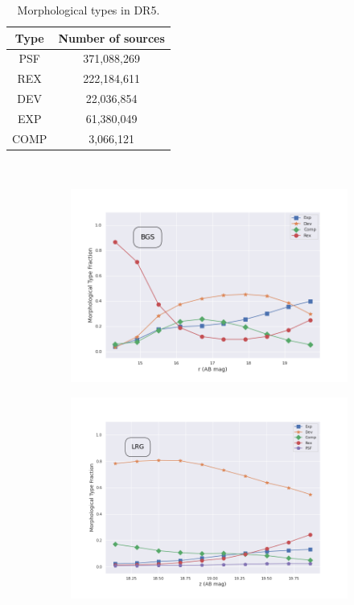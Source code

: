 \begin{table}
\caption{Morphological types in DR5.}
\label{tab:morph}
\centering
\begin{tabular}{|c|c|}
  \hline
  Type & Number of sources\\
  \hline \hline
   PSF & 371,088,269 \\
  \hline
   REX & 222,184,611 \\
  \hline
   DEV & 22,036,854 \\
  \hline
   EXP & 61,380,049 \\
  \hline
   COMP & 3,066,121	\\
  \hline
\end{tabular}
\end{table}\\


\begin{figure}
\begin{subfigure}{.5\textwidth}
\centering
\includegraphics[width=1\linewidth]{images/gmm/bgs_morph.png}
\caption{}
\end{subfigure}
\hfill
\begin{subfigure}{.5\textwidth}
\centering
\includegraphics[width=1\linewidth]{images/gmm/lrg_morph.png}

\end{subfigure}
\end{figure}
